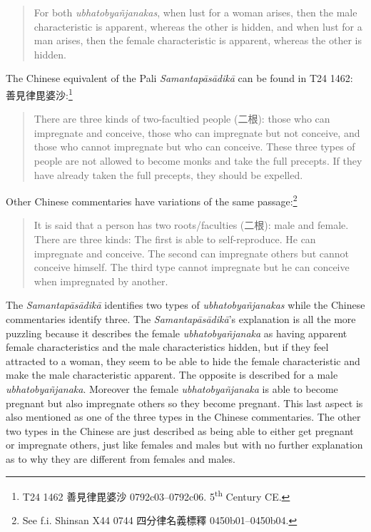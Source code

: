 \begin{quote}
For both {\em ubhatob­yañ­janakas}, when lust for a woman arises, then the male characteristic is apparent, whereas the other is hidden, and when lust for a man arises, then the female characteristic is apparent, whereas the other is hidden.
\end{quote}

The Chinese equivalent of the Pali {\em Samantapāsādikā} can be found in T24 1462: 善見律毘婆沙:\footnote{T24 1462 善見律毘婆沙 0792c03–0792c06. 5\textsuperscript{th} Century CE.}
\begin{quote}
There are three kinds of two-facultied people (二根): those who can impregnate and conceive, those who can impregnate but not conceive, and those who cannot impregnate but who can conceive. These three types of people are not allowed to become monks and take the full precepts. If they have already taken the full precepts, they should be expelled.
\end{quote}

Other Chinese commentaries have variations of the same passage:\footnote{See f.i. Shinsan X44 0744 四分律名義標釋 0450b01–0450b04.}
\begin{quote}
It is said that a person has two roots/faculties (二根): male and female. There are three kinds: The first is able to self-reproduce. He can impregnate and conceive. The second can impregnate others but cannot conceive himself. The third type cannot impregnate but he can conceive when impregnated by another. 
\end{quote}

The {\em Samantapāsādikā} identifies two types of {\em ubhatob­yañ­janakas} while the Chinese commentaries identify three. The {\em Samantapāsādikā}'s explanation is all the more puzzling because it describes the female {\em ubhatob­yañ­janaka} as having apparent female characteristics and the male characteristics hidden, but if they feel attracted to a woman, they seem to be able to hide the female characteristic and make the male characteristic apparent. The opposite is described for a male {\em ubhatob­yañ­janaka}. Moreover the female {\em ubhatob­yañ­janaka} is able to become pregnant but also impregnate others so they become pregnant. This last aspect is also mentioned as one of the three types in the Chinese commentaries. The other two types in the Chinese are just described as being able to either get pregnant or impregnate others, just like females and males but with no further explanation as to why they are different from females and males. 

